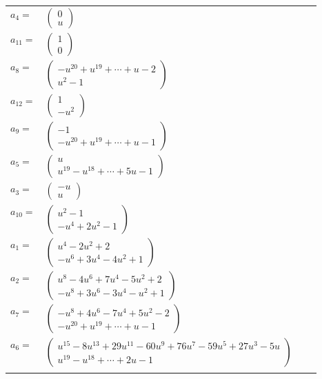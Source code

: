 \documentclass[1p]{elsarticle_modified}
\theoremstyle{definition}
\begin{document}
\begin{tabular}{m{7pt} m{180pt} m{7pt} m{180pt} }
\flushright $a_{4}=$&$\begin{pmatrix}0\\u\end{pmatrix}$ \\
\flushright $a_{11}=$&$\begin{pmatrix}1\\0\end{pmatrix}$ \\
\flushright $a_{8}=$&$\begin{pmatrix}- u^{20}+u^{19}+\cdots+u-2\\u^2-1\end{pmatrix}$ \\
\flushright $a_{12}=$&$\begin{pmatrix}1\\- u^2\end{pmatrix}$ \\
\flushright $a_{9}=$&$\begin{pmatrix}-1\\- u^{20}+u^{19}+\cdots+u-1\end{pmatrix}$ \\
\flushright $a_{5}=$&$\begin{pmatrix}u\\u^{19}- u^{18}+\cdots+5 u-1\end{pmatrix}$ \\
\flushright $a_{3}=$&$\begin{pmatrix}- u\\u\end{pmatrix}$ \\
\flushright $a_{10}=$&$\begin{pmatrix}u^2-1\\- u^4+2 u^2-1\end{pmatrix}$ \\
\flushright $a_{1}=$&$\begin{pmatrix}u^4-2 u^2+2\\- u^6+3 u^4-4 u^2+1\end{pmatrix}$ \\
\flushright $a_{2}=$&$\begin{pmatrix}u^8-4 u^6+7 u^4-5 u^2+2\\- u^8+3 u^6-3 u^4- u^2+1\end{pmatrix}$ \\
\flushright $a_{7}=$&$\begin{pmatrix}- u^8+4 u^6-7 u^4+5 u^2-2\\- u^{20}+u^{19}+\cdots+u-1\end{pmatrix}$ \\
\flushright $a_{6}=$&$\begin{pmatrix}u^{15}-8 u^{13}+29 u^{11}-60 u^9+76 u^7-59 u^5+27 u^3-5 u\\u^{19}- u^{18}+\cdots+2 u-1\end{pmatrix}$\\&\end{tabular}
\end{document}
